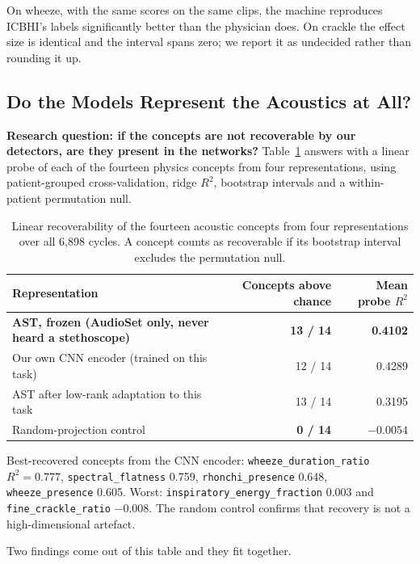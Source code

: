 \documentclass[journal,onecolumn]{IEEEtran}
\newcommand{\best}[1]{\textbf{#1}}
\begin{document}
On wheeze, with the same scores on the same clips, the machine reproduces ICBHI's
labels significantly better than the physician does. On crackle the effect size is
identical and the interval spans zero; we report it as undecided rather than
rounding it up.

\subsection{Do the Models Represent the Acoustics at All?}
\label{subsec:probe}

\textbf{Research question: if the concepts are not recoverable by our detectors,
are they present in the networks?} Table~\ref{tab:probe} answers with a linear
probe of each of the fourteen physics concepts from four representations, using
patient-grouped cross-validation, ridge $R^2$, bootstrap intervals and a
within-patient permutation null.

\begin{table}[!t]
\centering
\caption{Linear recoverability of the fourteen acoustic concepts from four
representations over all 6{,}898 cycles. A concept counts as recoverable if its
bootstrap interval excludes the permutation null.}
\label{tab:probe}
\small
\begin{tabular}{lrr}
\toprule
Representation & Concepts above chance & Mean probe $R^2$ \\
\midrule
\best{AST, frozen (AudioSet only, never heard a stethoscope)} & \best{13 / 14} & \best{0.4102} \\
Our own CNN encoder (trained on this task) & 12 / 14 & 0.4289 \\
AST after low-rank adaptation to this task & 13 / 14 & 0.3195 \\
Random-projection control & \best{0 / 14} & $-0.0054$ \\
\bottomrule
\end{tabular}

\vspace{2pt}
\footnotesize Best-recovered concepts from the CNN encoder:
\texttt{wheeze\_duration\_ratio} $R^2 = 0.777$, \texttt{spectral\_flatness} 0.759,
\texttt{rhonchi\_presence} 0.648, \texttt{wheeze\_presence} 0.605. Worst:
\texttt{inspiratory\_energy\_fraction} 0.003 and \texttt{fine\_crackle\_ratio}
$-0.008$. The random control confirms that recovery is not a high-dimensional
artefact.
\end{table}

Two findings come out of this table and they fit together.
\end{document}
